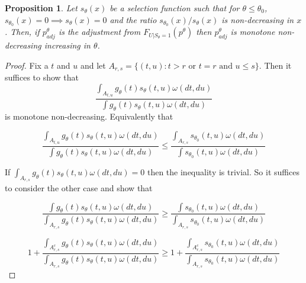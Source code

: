 \documentclass{article}
\newtheorem{proposition}{Proposition}
\begin{document}
\begin{appendix}
\begin{proposition}
    \label{prop:monotone_adjustment}
    Let $s_{\theta}(x)$ be a selection function such that for $\theta \leq \theta_0$, $s_{\theta_0}(x)= 0 \implies s_{\theta}(x) = 0$ and the ratio $s_{\theta_0}(x)/s_{\theta}(x)$ is non-decreasing in $x$. Then, if $p^{\theta}_{adj}$ is the adjustment from $F_{U | S_{\theta} = 1}(p^{\theta})$ then $p^{\theta}_{adj}$ is monotone non-decreasing increasing in $\theta$.  

\end{proposition}



\begin{proof}

        Fix a $t$ and $u$ and let $A_{r, s} = \{(t, u) : t > r \text{ or } t = r \text{ and } u \leq s \}$. Then it suffices to show that 
        \begin{equation*}
            \frac{ \int_{A_{t, u}}  g_{\theta}(t) s_{\theta}(t, u) \omega(dt, du)}{ \int g_{\theta}(t) s_{\theta}(t, u) \omega(dt, du)}
        \end{equation*}
        is monotone non-decreasing. Equivalently that  

        \begin{equation*}
            \frac{ \int_{A_{t, u}}  g_{\theta}(t) s_{\theta}(t, u) \omega(dt, du)}{ \int g_{\theta}(t) s_{\theta}(t, u) \omega(dt, du)} \leq \frac{ \int_{A_{r, s}} s_{\theta_0}(t, u) \omega(dt, du)}{ \int s_{\theta_0}(t, u) \omega(dt, du)}
        \end{equation*}

        If $\int_{A_{r, s}}  g_{\theta}(t) s_{\theta}(t, u) \omega(dt, du) = 0$ then the inequality is trivial. So it suffices to consider the other case and show that 

        \begin{equation*}
            \frac{ \int g_{\theta}(t) s_{\theta}(t, u) \omega(dt, du)} { \int_{A_{r, s}}  g_{\theta}(t) s_{\theta}(t, u) \omega(dt, du)} \geq \frac{ \int s_{\theta_0}(t, u) \omega(dt, du)}{ \int_{A_{r, s}} s_{\theta_0}(t, u) \omega(dt, du)}
        \end{equation*}

        \begin{equation*}
            1 + \frac{ \int_{A_{r, s}^c} g_{\theta}(t) s_{\theta}(t, u) \omega(dt, du)} { \int_{A_{r, s}}  g_{\theta}(t) s_{\theta}(t, u) \omega(dt, du)}\geq 1 + \frac{ \int_{A_{r, s}^c} s_{\theta_0}(t, u) \omega(dt, du)}{ \int_{A_{r, s}} s_{\theta_0}(t, u) \omega(dt, du)}
        \end{equation*}


\end{proof}
\end{appendix}
\end{document}
